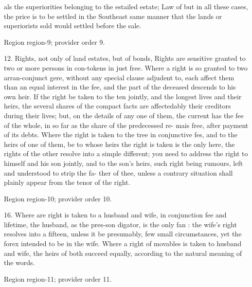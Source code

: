 \documentclass[11pt]{article}
\begin{document}
als the superiorities belonging to the estailed estate; Law of but in all these cases, the price is to be settled in the Southeast same manner that the lands or superiorists sold would settled before the sale.
\par

{\scriptsize\color{gray} Region region-9; provider order 9.\par}
\medskip

12. Rights, not only of land estates, but of bonds, Rights are sensitive granted to two or more persons in con-tokens in just free. Where a right is so granted to two arran-conjunct gere, without any special clause adjudent to, each affect them than an equal interest in the fee, and the part of the deceased descends to his own heir. If the right be taken to the ten jointly, and the longest lives and their heirs, the several shares of the compact facts are affectedably their creditors during their lives; but, on the details of any one of them, the current has the fee of the whole, in so far as the share of the predecessed re- mais free, after payment of its debts. Where the right is taken to the tree in conjunctive fes, and to the heirs of one of them, be to whose heirs the right is taken is the only here, the rights of the other resolve into a simple different; you need to address the right to himself and his son jointly, and to the son's heirs, such right being rumours, left and understood to strip the fa- ther of thee, unless a contrary situation shall plainly appear from the tenor of the right.
\par

{\scriptsize\color{gray} Region region-10; provider order 10.\par}
\medskip

16. Where are right is taken to a husband and wife, in conjunction fee and lifetime, the husband, as the pres-son digator, is the only fan : the wife's right resolves into a fifteen, unless it be presumably, few small circumstances, yet the forex intended to be in the wife. Where a right of movables is taken to husband and wife, the heirs of both succeed equally, according to the natural meaning of the words.
\par

{\scriptsize\color{gray} Region region-11; provider order 11.\par}
\medskip
\end{document}
